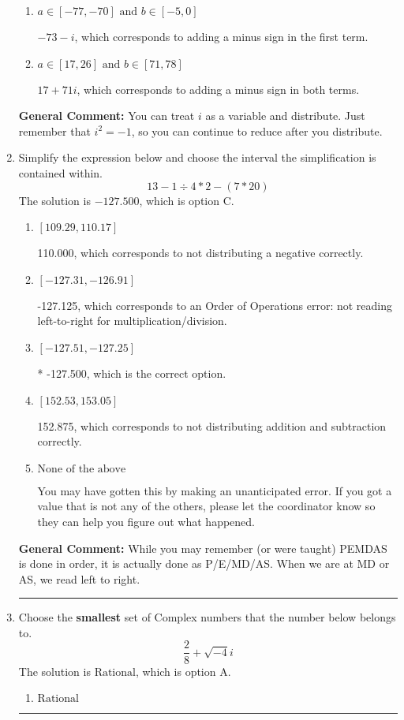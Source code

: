 \documentclass{extbook}[14pt]
\newcommand{\litem}[1]{\item #1

\rule{\textwidth}{0.4pt}}
\begin{document}
\begin{enumerate}
{\begin{enumerate}[label=\Alph*.]
 $-73 + i$, which corresponds to adding a minus sign in the second term.
\item \( a \in [-77, -70] \text{ and } b \in [-5, 0] \)

 $-73 - i$, which corresponds to adding a minus sign in the first term.
\item \( a \in [17, 26] \text{ and } b \in [71, 78] \)

 $17 + 71 i$, which corresponds to adding a minus sign in both terms.
\end{enumerate}

\textbf{General Comment:} You can treat $i$ as a variable and distribute. Just remember that $i^2=-1$, so you can continue to reduce after you distribute.
}
\litem{
Simplify the expression below and choose the interval the simplification is contained within.
\[ 13 - 1 \div 4 * 2 - (7 * 20) \]The solution is \( -127.500 \), which is option C.\begin{enumerate}[label=\Alph*.]
\item \( [109.29, 110.17] \)

 110.000, which corresponds to not distributing a negative correctly.
\item \( [-127.31, -126.91] \)

 -127.125, which corresponds to an Order of Operations error: not reading left-to-right for multiplication/division.
\item \( [-127.51, -127.25] \)

* -127.500, which is the correct option.
\item \( [152.53, 153.05] \)

 152.875, which corresponds to not distributing addition and subtraction correctly.
\item \( \text{None of the above} \)

 You may have gotten this by making an unanticipated error. If you got a value that is not any of the others, please let the coordinator know so they can help you figure out what happened.
\end{enumerate}

\textbf{General Comment:} While you may remember (or were taught) PEMDAS is done in order, it is actually done as P/E/MD/AS. When we are at MD or AS, we read left to right.
}
\litem{
Choose the \textbf{smallest} set of Complex numbers that the number below belongs to.
\[ \frac{2}{8}+\sqrt{-4}i \]The solution is \( \text{Rational} \), which is option A.\begin{enumerate}[label=\Alph*.]
\item \( \text{Rational} \)


\end{enumerate}}
\end{enumerate}
\end{document}
